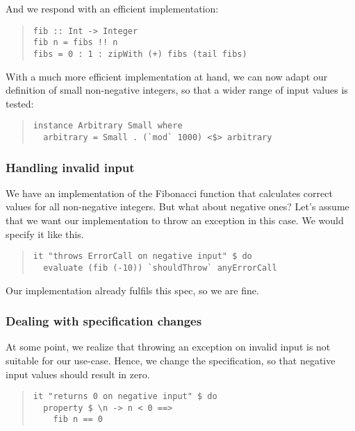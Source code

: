 \documentclass[preprint]{sigplanconf}
\begin{document}
\noindent And we respond with an efficient implementation:

\begin{quote}
\small
\begin{verbatim}
fib :: Int -> Integer
fib n = fibs !! n
fibs = 0 : 1 : zipWith (+) fibs (tail fibs)
\end{verbatim}
\end{quote}

\noindent With a much more efficient implementation at hand, we can
now adapt our definition of small non-negative integers, so that
a wider range of input values is tested:

\begin{quote}
\small
\begin{verbatim}
instance Arbitrary Small where
  arbitrary = Small . (`mod` 1000) <$> arbitrary
\end{verbatim}
\end{quote}


\subsubsection{Handling invalid input}

We have an implementation of the Fibonacci function
that calculates correct values for all non-negative integers.
But what about negative ones? Let's assume that we want our
implementation to throw an exception in this case. We would
specify it like this.

\begin{quote}
\small
\begin{verbatim}
it "throws ErrorCall on negative input" $ do
  evaluate (fib (-10)) `shouldThrow` anyErrorCall
\end{verbatim}
\end{quote}

\noindent Our implementation already fulfils this spec, so we are
fine.

\subsubsection{Dealing with specification changes}

At some point, we realize that throwing an exception on invalid input
is not suitable for our use-case.  Hence, we change the specification,
so that negative input values should result in zero.

\begin{quote}
\small
\begin{verbatim}
it "returns 0 on negative input" $ do
  property $ \n -> n < 0 ==>
    fib n == 0
\end{verbatim}
\end{quote}
\end{document}
